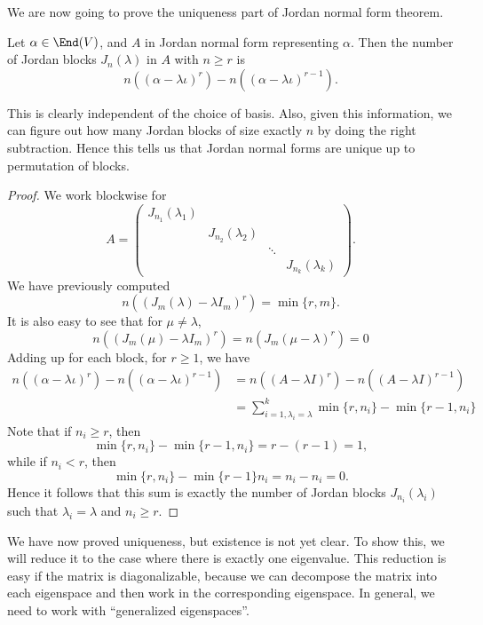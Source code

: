 \documentclass[a4paper]{article}
\begin{document}
We are now going to prove the uniqueness part of Jordan normal form theorem.
\begin{thm}[]
  Let $\alpha \in \End(V)$, and $A$ in Jordan normal form representing $\alpha$. Then the number of Jordan blocks $J_n(\lambda)$ in $A$ with $n \geq r$ is
  \[
    n((\alpha - \lambda\iota)^r) - n((\alpha - \lambda\iota)^{r - 1}).
  \]
\end{thm}
This is clearly independent of the choice of basis. Also, given this information, we can figure out how many Jordan blocks of size exactly $n$ by doing the right subtraction. Hence this tells us that Jordan normal forms are unique up to permutation of blocks.

\begin{proof}
  We work blockwise for
  \[
    A =
    \begin{pmatrix}
      J_{n_1}(\lambda_1)\\
      & J_{n_2}(\lambda_2)\\
      & & \ddots\\\
      & & & J_{n_k} (\lambda_k)
    \end{pmatrix}.
  \]
  We have previously computed
  \[
    n((J_m(\lambda) - \lambda I_m)^r) = \min\{r, m\}.
  \]
  It is also easy to see that for $\mu \not= \lambda$,
  \[
    n((J_m(\mu) - \lambda I_m)^r) = n(J_m(\mu - \lambda)^r) = 0
  \]
  Adding up for each block, for $r \geq 1$, we have
  \begin{align*}
    n((\alpha - \lambda \iota)^r) - n((\alpha - \lambda \iota)^{r - 1}) &= n((A - \lambda I)^r) - n((A - \lambda I)^{r - 1})\\
    &= \sum_{i = 1, \lambda_i = \lambda}^k \min\{r, n_i\} - \min\{r - 1, n_i\}
  \end{align*}
  Note that if $n_i \geq r$, then
  \[
    \min \{r, n_i\} - \min\{r - 1, n_i\} = r - (r - 1) = 1,
  \]
  while if $n_i < r$, then
  \[
    \min\{r, n_i\} - \min\{r - 1\}n_i = n_i - n_i = 0.
  \]
  Hence it follows that this sum is exactly the number of Jordan blocks $J_{n_i}(\lambda_i)$ such that $\lambda_i = \lambda$ and $n_i \geq r$.
\end{proof}

We have now proved uniqueness, but existence is not yet clear. To show this, we will reduce it to the case where there is exactly one eigenvalue. This reduction is easy if the matrix is diagonalizable, because we can decompose the matrix into each eigenspace and then work in the corresponding eigenspace. In general, we need to work with ``generalized eigenspaces''.
\end{document}

